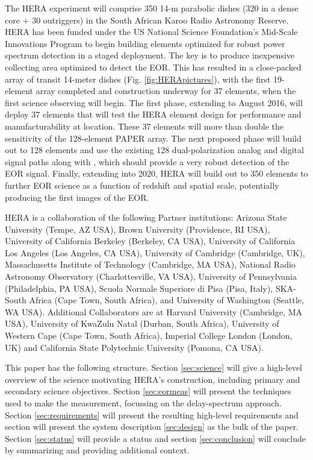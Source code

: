 \documentclass[preprint,11pt]{aastex}
\begin{document}
The HERA experiment will comprise 
350 14-m parabolic dishes (320 in a dense core $+$ 30 outriggers) in the South African Karoo Radio
Astronomy Reserve.
HERA has been funded under the US National Science Foundation's Mid-Scale Innovations Program to begin building elements optimized for robust power spectrum detection in a 
staged deployment.  The key is to produce inexpensive collecting area optimized to detect the EOR.  This has resulted in a close-packed array of transit 14-meter dishes (Fig. \ref{fig:HERApictures}), with the first 19-element array completed and construction underway for 37 elements, when the first science observing will begin.
The first phase, extending to August 2016, will deploy 37 elements that will test the HERA element design for performance and manufacturability at location.  These 37 elements will more 
than double the sensitivity of the 128-element PAPER array.  The next proposed phase will build out to 128 elements and use the existing 128 dual-polarization analog and digital signal 
paths along with , which should provide a very robust detection of the EOR signal.  Finally, extending into 2020, HERA will build out to 350 elements to further EOR science as a function 
of redshift and spatial scale, potentially producing the first images of the EOR.

HERA is a collaboration of the following Partner institutions:  
Arizona State University (Tempe, AZ USA), 
Brown University (Providence, RI USA), 
University of California Berkeley (Berkeley, CA USA), 
University of California Los Angeles (Los Angeles, CA USA), 
University of Cambridge (Cambridge, UK), 
Massachusetts Institute of Technology (Cambridge, MA USA), 
National Radio Astronomy Observatory (Charlottesville, VA USA), 
University of Pennsylvania (Philadelphia, PA USA), 
Scuola Normale Superiore di Pisa (Pisa, Italy),
SKA-South Africa (Cape Town, South Africa), and
University of Washington (Seattle, WA USA).  
Additional Collaborators are at 
Harvard University (Cambridge, MA USA),  
University of KwaZulu Natal (Durban, South Africa), 
University of Western Cape (Cape Town, South Africa), 
Imperial College London  (London, UK) and 
California State Polytechnic University (Pomona, CA USA).

This paper has the following structure.  Section \ref{sec:science} will give a high-level overview of the science motivating HERA's construction, including primary and secondary science objectives.  Section \ref{sec:eormeas} will present the techniques used to make the measurement, focussing on the delay-spectrum approach.  Section \ref{sec:requirements} will present the resulting high-level requirements and section will present the system description \ref{sec:design} as the bulk of the paper.   Section \ref{sec:status} will provide a status and section \ref{sec:conclusion} will conclude by summarizing and providing additional context.
\end{document}
